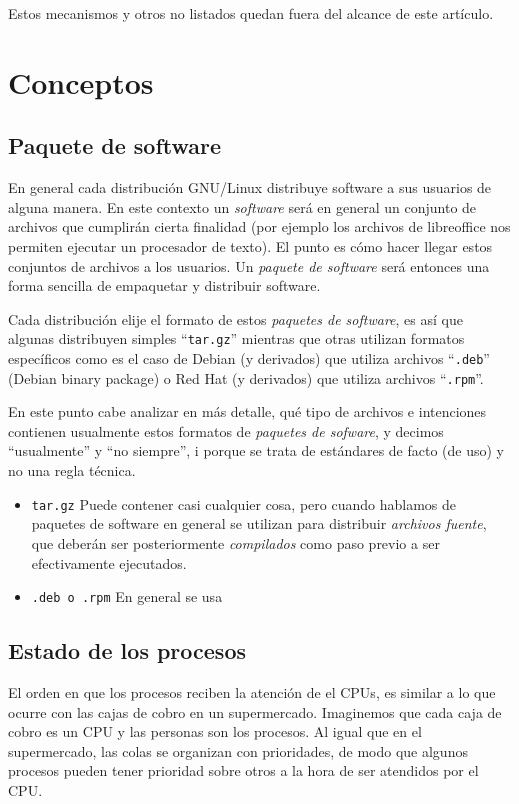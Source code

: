 \documentclass[12pt]{article}
\begin{document}
Estos mecanismos y otros no listados quedan fuera del alcance de este artículo.

\section*{Conceptos}

\subsection*{Paquete de software}

En general cada distribución GNU/Linux distribuye software a sus usuarios
de alguna manera. En este contexto un \textit{software} será en general un
conjunto de archivos que cumplirán cierta finalidad (por ejemplo los 
archivos de libreoffice nos permiten ejecutar un procesador de texto). El 
punto es cómo hacer llegar estos conjuntos de archivos a los usuarios. Un 
\textit{paquete de software} será entonces una forma sencilla de empaquetar
y distribuir software.

Cada distribución elije el formato de estos \textit{paquetes de software}, 
es así que algunas distribuyen simples ``\texttt{tar.gz}'' mientras que 
otras utilizan formatos específicos como es el caso de Debian (y derivados)
que utiliza archivos ``\texttt{.deb}'' (Debian binary package) o Red Hat 
(y derivados) que utiliza archivos ``\texttt{.rpm}''.

En este punto cabe analizar en más detalle, qué tipo de archivos e 
intenciones contienen usualmente estos formatos de 
\textit{paquetes de sofware}, y decimos ``usualmente'' y ``no siempre'',  i
porque se trata de estándares de facto (de uso) y no una regla técnica. 

\begin{itemize}
\item \texttt{tar.gz} Puede contener casi cualquier cosa, pero cuando hablamos
de paquetes de software en general se utilizan para distribuir \textit{archivos
fuente}, que deberán ser posteriormente \textit{compilados} como paso previo 
a ser efectivamente ejecutados. 
\item \texttt{.deb o .rpm} En general se usa
\end{itemize}

\subsection*{Estado de los procesos}

El orden en que los procesos reciben la atención de el CPUs, es 
similar a lo que ocurre con las cajas de cobro en un supermercado. 
Imaginemos que cada caja de cobro es un CPU y las personas son los 
procesos. Al igual que en el supermercado, las colas se organizan con 
prioridades, de modo que algunos procesos pueden tener prioridad 
sobre otros a la hora de ser atendidos por el CPU. 
\end{document}
